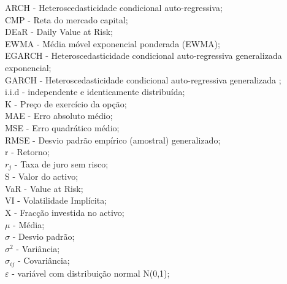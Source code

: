 \documentclass[
  12pt,
  a4paper,
  openany]{book}
\theoremstyle{definition}
\theoremstyle{definition}
\theoremstyle{definition}
\theoremstyle{remark}
\begin{document}
ARCH - Heteroscedasticidade condicional auto-regressiva;\\

CMP - Reta do mercado capital;\\

DEaR - Daily Value at Risk;\\

EWMA - Média móvel exponencial ponderada (EWMA);\\

EGARCH - Heteroscedasticidade condicional auto-regressiva generalizada exponencial;\\

GARCH - Heteroscedasticidade condicional auto-regressiva generalizada ;\\

i.i.d - independente e identicamente distribuída;\\

K - Preço de exercício da opção;\\

MAE - Erro absoluto médio;\\

MSE - Erro quadrático médio;\\

RMSE - Desvio padrão empírico (amostral) generalizado;\\

r - Retorno;\\

\(r_j\) - Taxa de juro sem risco;\\

S - Valor do activo;\\

VaR - Value at Risk;\\

VI - Volatilidade Implícita;\\

X - Fracção investida no activo;\\

\(\mu\) - Média;\\

\(\sigma\) - Desvio padrão;\\

\(\sigma^2\) - Variância;\\

\(\sigma_{ij}\) - Covariância;\\

\(\varepsilon\) - variável com distribuição normal N(0,1);\\
\end{document}
